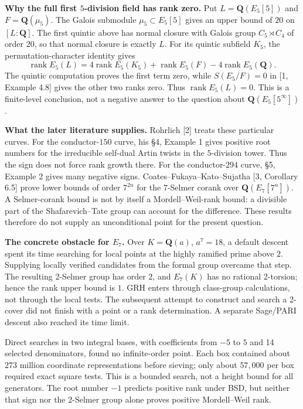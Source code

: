 \documentclass[11pt,a4paper]{article}
\newcommand{\Q}{\mathbf Q}
\newcommand{\rk}{\operatorname{rank}}
\begin{document}
\textbf{Why the full first $5$-division field has rank zero.}
Put $L=\Q(E_5[5])$ and $F=\Q(\mu_5)$. The Galois submodule $\mu_5\subset E_5[5]$ gives an upper bound of $20$ on $[L:\Q]$. The first quintic above has normal closure with Galois group $C_5\rtimes C_4$ of order $20$, so that normal closure is exactly $L$. For its quintic subfield $K_5$, the permutation-character identity gives
\[
 \rk E_5(L)=4\rk E_5(K_5)+\rk E_5(F)-4\rk E_5(\Q).
\]
The quintic computation proves the first term zero, while $S(E_5/F)=0$ in [1, Example 4.8] gives the other two ranks zero. Thus $\rk E_5(L)=0$. This is a finite-level conclusion, not a negative answer to the question about $\Q(E_5[5^\infty])$.

\newpage
\textbf{What the later literature supplies.}
Rohrlich [2] treats these particular curves. For the conductor-$150$ curve, his \S4, Example 1 gives positive root numbers for the irreducible self-dual Artin twists in the $5$-division tower. Thus the sign does not force rank growth there. For the conductor-$294$ curve, \S5, Example 2 gives many negative signs. Coates--Fukaya--Kato--Sujatha [3, Corollary 6.5] prove lower bounds of order $7^{2n}$ for the $7$-Selmer corank over $\Q(E_7[7^n])$. A Selmer-corank bound is not by itself a Mordell--Weil-rank bound: a divisible part of the Shafarevich--Tate group can account for the difference. These results therefore do not supply an unconditional point for the present question.

\textbf{The concrete obstacle for $E_7$.}
Over $K=\Q(a)$, $a^7=18$, a default descent spent its time searching for local points at the highly ramified prime above $2$. Supplying locally verified candidates from the formal group overcame that step. The resulting 2-Selmer group has order $2$, and $E_7(K)$ has no rational 2-torsion; hence the rank upper bound is $1$. GRH enters through class-group calculations, not through the local tests. The subsequent attempt to construct and search a 2-cover did not finish with a point or a rank determination. A separate Sage/PARI descent also reached its time limit.

Direct searches in two integral bases, with coefficients from $-5$ to $5$ and 14 selected denominators, found no infinite-order point. Each box contained about $273$ million coordinate representations before sieving; only about $57{,}000$ per box required exact square tests. This is a bounded search, not a height bound for all generators. The root number $-1$ predicts positive rank under BSD, but neither that sign nor the 2-Selmer group alone proves positive Mordell--Weil rank.
\end{document}
